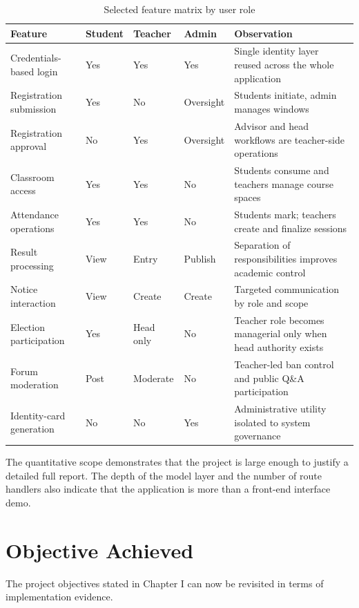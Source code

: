 \documentclass[12pt,a4paper]{report}
\begin{document}
\begin{table}[H]
  \centering
  \caption{Selected feature matrix by user role}
  \label{tab:role-feature-matrix}
  \renewcommand{\arraystretch}{1.2}
  \begin{tabularx}{\textwidth}{p{2.6in}p{0.7in}p{0.7in}p{0.7in}Y}
    \toprule
    \textbf{Feature} & \textbf{Student} & \textbf{Teacher} & \textbf{Admin} & \textbf{Observation} \\
    \midrule
    Credentials-based login & Yes & Yes & Yes & Single identity layer reused across the whole application \\
    Registration submission & Yes & No & Oversight & Students initiate, admin manages windows \\
    Registration approval & No & Yes & Oversight & Advisor and head workflows are teacher-side operations \\
    Classroom access & Yes & Yes & No & Students consume and teachers manage course spaces \\
    Attendance operations & Yes & Yes & No & Students mark; teachers create and finalize sessions \\
    Result processing & View & Entry & Publish & Separation of responsibilities improves academic control \\
    Notice interaction & View & Create & Create & Targeted communication by role and scope \\
    Election participation & Yes & Head only & No & Teacher role becomes managerial only when head authority exists \\
    Forum moderation & Post & Moderate & No & Teacher-led ban control and public Q\&A participation \\
    Identity-card generation & No & No & Yes & Administrative utility isolated to system governance \\
    \bottomrule
  \end{tabularx}
\end{table}

The quantitative scope demonstrates that the project is large enough to justify a detailed full report. The depth of the model layer and the number of route handlers also indicate that the application is more than a front-end interface demo.

\section{Objective Achieved}
The project objectives stated in Chapter I can now be revisited in terms of implementation evidence.
\end{document}
